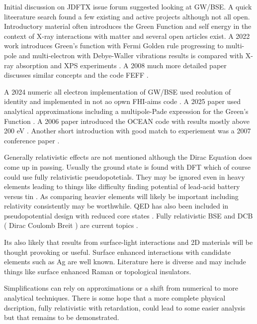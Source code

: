 



Initial discussion on JDFTX issue forum suggested looking at 
GW/BSE. A quick liteerature search found a few existing and active
projects although not all open. Introductory material
often introduces the Green Function and self energy in the context
of X-ray interactions with matter and several open articles
exist. A 2022 work introduces Green's function with Fermi Golden rule
 progressing to multi-pole and multi-electron with Debye-Waller
vibrations 
results  is compared with X-ray absorption and XPS experiments
\cite{Kas_Rehr_Vila_Green_functions_applied_2022}. 
A 2008 much more detailed paper discusses similar concepts
and the code FEFF 
\cite{Rehr_Kas_Prange_initio_theory_2009}.

A 2024 numeric all electron implementation of GW/BSE used reolution of identity
and implemented in not ao opwn FHI-aims code 
\cite{Zhou_Yao_Blum_electron_2024}.
A 2025 paper used analytical approximations including a multipole-Pade 
expression for the Green's Function
\cite{2025arXiv250109121L}.
A 2006 paper introduced the OCEAN code with results mostly above 200 eV
\cite{Gilmore_Vinson_Shirley_Efficient_implementation_core_2015}.
Another short introduction with good match to experiement was
a 2007 conference paper 
\cite{Rehr_Kas_Prange_Inelastic_Losses_Multi_2007}.

Generally relativistic effects are not mentioned although the Dirac
Equation does come up in passing. Usually the ground state is found
with DFT which of course could use fully relativistic pseudopotetials.
They may be ignored even in heavy elements leading to things like 
difficulty finding potential of lead-acid battery versus tin
\cite{Ahuja_Blomqvist_Larsson_Relativity_Lead_2011}
. As comparing heavier elements will likely be important including
relativity consistently may be worthwhile.
QED has also been included in pseudopotential design with reduced
core states
\cite{Zaitsevskii_Mosyagin_Oleynichenko_Generalized_relativistic_smallcore_pseudopotentials_2023}.
Fully relativistic BSE and DCB ( Dirac Coulomb Breit ) are current
topics \cite{Ferenc_Matyus_Born_Oppenheimer_Dirac_2023}.



Its also likely that results from surface-light interactions and
2D materials will be thought provoking or useful. Surface enhanced
interactions with candidate elements such as Ag are well known.
Literature here is diverse and may include things like surface
enhanced Raman or topological insulators. 

Simplifications can rely on approximations or a shift from numerical
to more analytical techniques. There is some hope that a more complete
physical dscription, fully relativistic with retardation, could
lead to some easier analysis but that remains to be demonstrated.



